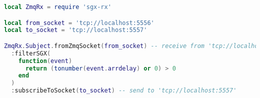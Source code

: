 \begin{lstlisting}[language=LUA,caption={Process pipeline with Zmq-RxLua using SGX: filter.},label=rx-processing-sgx-filter-event]
local ZmqRx = require 'sgx-rx'

local from_socket = 'tcp://localhost:5556'
local to_socket = 'tcp://localhost:5557'

ZmqRx.Subject.fromZmqSocket(from_socket) -- receive from 'tcp://localhost:5556'
  :filterSGX(
    function(event)
      return (tonumber(event.arrdelay) or 0) > 0
    end
  )
  :subscribeToSocket(to_socket) -- send to 'tcp://localhost:5557'
\end{lstlisting}
